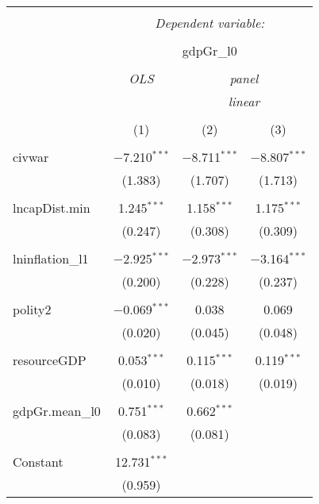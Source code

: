 
\begin{table}[!htbp] \centering 
  \caption{} 
  \label{} 
\begin{tabular}{@{\extracolsep{5pt}}lccc} 
\\[-1.8ex]\hline 
\hline \\[-1.8ex] 
 & \multicolumn{3}{c}{\textit{Dependent variable:}} \\ 
\cline{2-4} 
\\[-1.8ex] & \multicolumn{3}{c}{gdpGr\_l0} \\ 
\\[-1.8ex] & \textit{OLS} & \multicolumn{2}{c}{\textit{panel}} \\ 
 & \textit{} & \multicolumn{2}{c}{\textit{linear}} \\ 
\\[-1.8ex] & (1) & (2) & (3)\\ 
\hline \\[-1.8ex] 
 civwar & $-$7.210$^{***}$ & $-$8.711$^{***}$ & $-$8.807$^{***}$ \\ 
  & (1.383) & (1.707) & (1.713) \\ 
  & & & \\ 
 lncapDist.min & 1.245$^{***}$ & 1.158$^{***}$ & 1.175$^{***}$ \\ 
  & (0.247) & (0.308) & (0.309) \\ 
  & & & \\ 
 lninflation\_l1 & $-$2.925$^{***}$ & $-$2.973$^{***}$ & $-$3.164$^{***}$ \\ 
  & (0.200) & (0.228) & (0.237) \\ 
  & & & \\ 
 polity2 & $-$0.069$^{***}$ & 0.038 & 0.069 \\ 
  & (0.020) & (0.045) & (0.048) \\ 
  & & & \\ 
 resourceGDP & 0.053$^{***}$ & 0.115$^{***}$ & 0.119$^{***}$ \\ 
  & (0.010) & (0.018) & (0.019) \\ 
  & & & \\ 
 gdpGr.mean\_l0 & 0.751$^{***}$ & 0.662$^{***}$ &  \\ 
  & (0.083) & (0.081) &  \\ 
  & & & \\ 
 Constant & 12.731$^{***}$ &  &  \\ 
  & (0.959) &  &  \\ 

\end{tabular}
\end{table}
